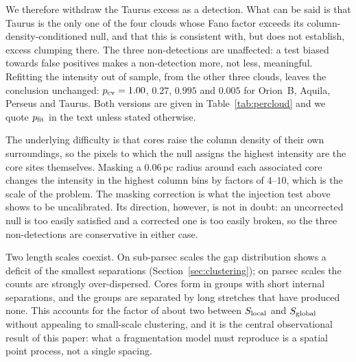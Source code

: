 \documentclass[usenatbib,twoside,twocolumn]{mnras}
\begin{document}
We therefore withdraw the Taurus excess as a detection. What can be said is that Taurus is the only one of the four clouds whose Fano factor exceeds its column-density-conditioned null, and that this is consistent with, but does not establish, excess clumping there. The three non-detections are unaffected: a test biased towards false positives makes a non-detection more, not less, meaningful. Refitting the intensity out of sample, from the other three clouds, leaves the conclusion unchanged: $p_{\rm cv}=1.00$, $0.27$, $0.995$ and $0.005$ for Orion~B, Aquila, Perseus and Taurus. Both versions are given in Table~\ref{tab:percloud} and we quote $p_{\rm fit}$ in the text unless stated otherwise.

The underlying difficulty is that cores raise the column density of their own surroundings, so the pixels to which the null assigns the highest intensity are the core sites themselves. Masking a $0.06$\,pc radius around each associated core changes the intensity in the highest column bins by factors of $4$--$10$, which is the scale of the problem. The masking correction is what the injection test above shows to be uncalibrated. Its direction, however, is not in doubt: an uncorrected null is too easily satisfied and a corrected one is too easily broken, so the three non-detections are conservative in either case.

Two length scales coexist. On sub-parsec scales the gap distribution shows a deficit of the smallest separations (Section~\ref{sec:clustering}); on parsec scales the counts are strongly over-dispersed. Cores form in groups with short internal separations, and the groups are separated by long stretches that have produced none. This accounts for the factor of about two between $S_{\rm local}$ and $S_{\rm global}$ without appealing to small-scale clustering, and it is the central observational result of this paper: what a fragmentation model must reproduce is a spatial point process, not a single spacing.
\end{document}
